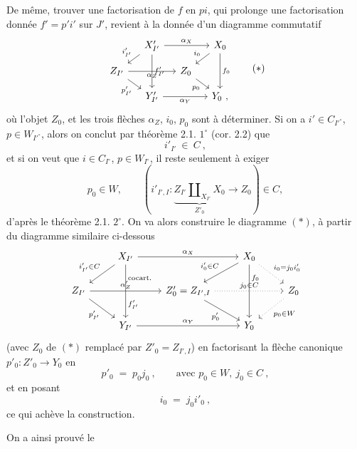 \documentclass[11pt]{article}
\newcommand{\printedpage}[1]{\marginpar{\footnotesize p.~#1}}
\newcommand{\msp}[1]{\marginpar{\footnotesize [#1]}}
\begin{document}
De même, trouver une factorisation de $f$ en $pi$, qui prolonge une factorisation donnée $f'=p'i'$ sur $J'$, revient à la donnée d'un diagramme commutatif
\[
\begin{tikzcd}[column sep=small, row sep=small]
& X'_{I'} \arrow[rr, "\alpha_X"] \arrow[dl, "i'_{I'}"'] \arrow[dd, "f'_{I'}"] & & X_0 \arrow[dl, "i_0"'] \arrow[dd, "f_0"] \\
Z_{I'} \arrow[rr, "\alpha_Z"'] \arrow[dr, "p'_{I'}"'] & & Z_0 \arrow[dr, "p_0"'] & \\
& Y'_{I'} \arrow[rr, "\alpha_Y"'] & & Y_0\ ,
\end{tikzcd}
\tag*{$(*)$}
\]
\msp{48: blank}
\msp{49}
où l'objet $Z_0$, et les trois flèches $\alpha_Z$, $i_0$, $p_0$ sont à déterminer. Si on a $i'\in C_{I'^\circ}$, $p\in W_{I'^\circ}$, %
alors on conclut par théorème 2.1. $1^\circ$ (cor. 2.2) que
\[
i'_{I'}\ \in\ C\ ,
\]
et si on veut que $i\in C_{I^\circ}$, $p\in W_{I^\circ}$, il reste seulement à exiger
\[
p_0\in W, \qquad (i'_{I',I}:\underbrace{Z_{I'}\amalg_{X_{I'}}X_0}_{Z'_0}\longrightarrow Z_0)\in C,
\]
d'après le théorème 2.1. $2^\circ$. On va alors construire le diagramme $(*)$, à partir du diagramme similaire ci-dessous
\[
\begin{tikzcd}
& X_{I'} \arrow[rr, "\alpha_X"] \arrow[dl, "i'_{I'}\in C"'] \arrow[dd, "\text{cocart.}" {pos=0.25}, "f'_{I'}" {pos=0.75}] & & X_0 \arrow[dl, "i'_0\in C"'] \arrow[dd, "f_0" {pos=0.25}] \arrow[dr, dotted, "i_0=j_0i'_0"] & \\
Z_{I'} \arrow[rr, "\alpha'_Z"] \arrow[dr, "p'_{I'}"'] & & Z'_0=Z_{I',I} \arrow[rr, dotted, "j_0\in C"] \arrow[dr, "p'_0"'] & & Z_0 \arrow[dl, dotted, "p_0\in W"] \\
& Y_{I'} \arrow[rr, "\alpha_Y"] & & Y_0 &
\end{tikzcd}
\]
(avec $Z_0$ de $(*)$ remplacé par $Z'_0=Z_{I',I}$) en factorisant la flèche canonique $p'_0:Z'_0\longrightarrow Y_0$ en
\[
p'_0 \;=\; p_0j_0\ , \qquad \text{avec } p_0\in W,\ j_0\in C\ ,
\]
et en posant
\[
i_0 \;=\; j_0i'_0\ ,
\]
ce qui achève la construction.

On a ainsi prouvé le

\printedpage{26}
\end{document}
